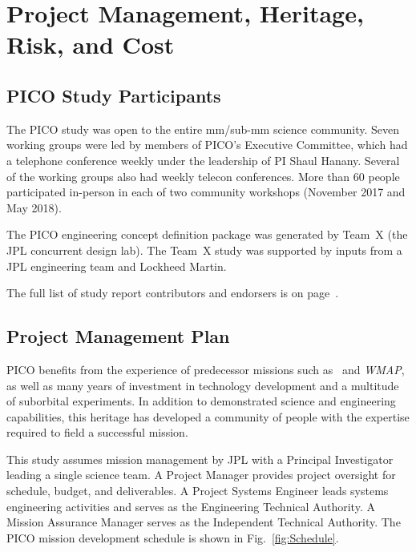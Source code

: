\section{Project Management, Heritage, Risk, and Cost}
\label{sec:project_management} %

\subsection{PICO Study Participants}
\label{sec:study_participants} %

The PICO study was open to the entire mm/sub-mm science community. Seven working groups were led by members of PICO's Executive Committee, which had a telephone conference weekly under the leadership of PI Shaul Hanany. Several of the working groups also had weekly telecon conferences. More than 60 people participated in-person in each of two community workshops (November 2017 and May 2018).

The PICO engineering concept definition package was generated by Team~X (the JPL concurrent design lab). The Team~X study was supported by inputs from a JPL engineering team and Lockheed Martin.

The full list of study report contributors and endorsers is on page~\pageref{authorlist}.

\subsection{Project Management Plan}
\label{sec:management_plan} %

PICO benefits from the experience of predecessor missions such as \planck\ and \textit{WMAP}, as well as many years of investment in technology development and a multitude of suborbital experiments. In addition to demonstrated science and engineering capabilities, this heritage has developed a community of people with the expertise required to field a successful mission.

This study assumes mission management by JPL with a Principal Investigator leading a single science team. A Project Manager provides project oversight for schedule, budget, and deliverables. A Project Systems Engineer leads systems engineering activities and serves as the Engineering Technical Authority. A Mission Assurance Manager serves as the Independent Technical Authority. The PICO mission development schedule is shown in Fig.~\ref{fig:Schedule}.

